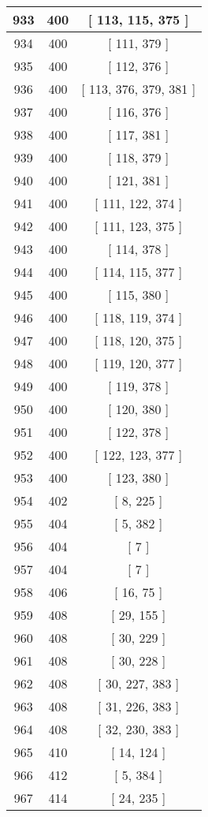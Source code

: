 \begin{center}
\begin{longtable}[H]{|| c c c ||}
933 & 400 & [ 113, 115, 375 ]
\\\hline
934 & 400 & [ 111, 379 ]
\\\hline
935 & 400 & [ 112, 376 ]
\\\hline
936 & 400 & [ 113, 376, 379, 381 ]
\\\hline
937 & 400 & [ 116, 376 ]
\\\hline
938 & 400 & [ 117, 381 ]
\\\hline
939 & 400 & [ 118, 379 ]
\\\hline
940 & 400 & [ 121, 381 ]
\\\hline
941 & 400 & [ 111, 122, 374 ]
\\\hline
942 & 400 & [ 111, 123, 375 ]
\\\hline
943 & 400 & [ 114, 378 ]
\\\hline
944 & 400 & [ 114, 115, 377 ]
\\\hline
945 & 400 & [ 115, 380 ]
\\\hline
946 & 400 & [ 118, 119, 374 ]
\\\hline
947 & 400 & [ 118, 120, 375 ]
\\\hline
948 & 400 & [ 119, 120, 377 ]
\\\hline
949 & 400 & [ 119, 378 ]
\\\hline
950 & 400 & [ 120, 380 ]
\\\hline
951 & 400 & [ 122, 378 ]
\\\hline
952 & 400 & [ 122, 123, 377 ]
\\\hline
953 & 400 & [ 123, 380 ]
\\\hline
954 & 402 & [ 8, 225 ]
\\\hline
955 & 404 & [ 5, 382 ]
\\\hline
956 & 404 & [ 7 ]
\\\hline
957 & 404 & [ 7 ]
\\\hline
958 & 406 & [ 16, 75 ]
\\\hline
959 & 408 & [ 29, 155 ]
\\\hline
960 & 408 & [ 30, 229 ]
\\\hline
961 & 408 & [ 30, 228 ]
\\\hline
962 & 408 & [ 30, 227, 383 ]
\\\hline
963 & 408 & [ 31, 226, 383 ]
\\\hline
964 & 408 & [ 32, 230, 383 ]
\\\hline
965 & 410 & [ 14, 124 ]
\\\hline
966 & 412 & [ 5, 384 ]
\\\hline
967 & 414 & [ 24, 235 ]
\\\hline

\end{longtable}
\end{center}
